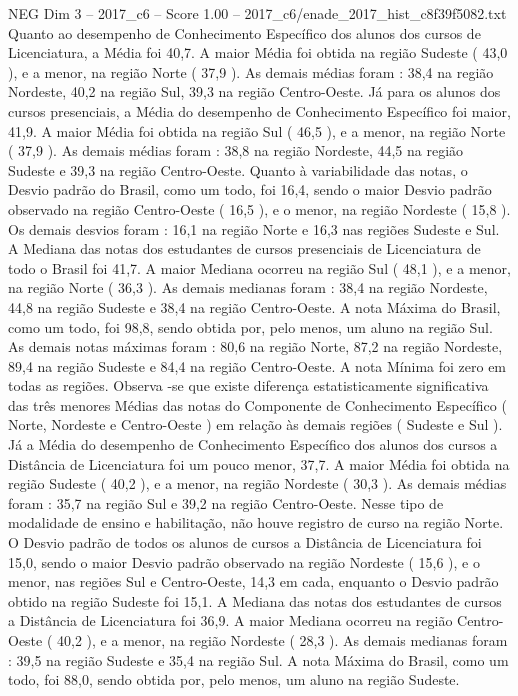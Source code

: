 \begin{textsample}{NEG Dim 3 – 2017\_c6 – Score 1.00 – 2017\_c6/enade\_2017\_hist\_c8f39f5082.txt}
Quanto ao desempenho de Conhecimento Específico dos alunos dos cursos de Licenciatura, a Média foi 40,7.
A maior Média foi obtida na região Sudeste ( 43,0 ), e a menor, na região Norte ( 37,9 ).
As demais médias foram : 38,4 na região Nordeste, 40,2 na região Sul, 39,3 na região Centro-Oeste.
Já para os alunos dos cursos presenciais, a Média do desempenho de Conhecimento Específico foi maior, 41,9.
A maior Média foi obtida na região Sul ( 46,5 ), e a menor, na região Norte ( 37,9 ).
As demais médias foram : 38,8 na região Nordeste, 44,5 na região Sudeste e 39,3 na região Centro-Oeste.
Quanto à variabilidade das notas, o Desvio padrão do Brasil, como um todo, foi 16,4, sendo o maior Desvio padrão observado na região Centro-Oeste ( 16,5 ), e o menor, na região Nordeste ( 15,8 ).
Os demais desvios foram : 16,1 na região Norte e 16,3 nas regiões Sudeste e Sul.
A Mediana das notas dos estudantes de cursos presenciais de Licenciatura de todo o Brasil foi 41,7.
A maior Mediana ocorreu na região Sul ( 48,1 ), e a menor, na região Norte ( 36,3 ).
As demais medianas foram : 38,4 na região Nordeste, 44,8 na região Sudeste e 38,4 na região Centro-Oeste.
A nota Máxima do Brasil, como um todo, foi 98,8, sendo obtida por, pelo menos, um aluno na região Sul.
As demais notas máximas foram : 80,6 na região Norte, 87,2 na região Nordeste, 89,4 na região Sudeste e 84,4 na região Centro-Oeste.
A nota Mínima foi zero em todas as regiões.
Observa -se que existe diferença estatisticamente significativa das três menores Médias das notas do Componente de Conhecimento Específico ( Norte, Nordeste e Centro-Oeste ) em relação às demais regiões ( Sudeste e Sul ).
Já a Média do desempenho de Conhecimento Específico dos alunos dos cursos a Distância de Licenciatura foi um pouco menor, 37,7.
A maior Média foi obtida na região Sudeste ( 40,2 ), e a menor, na região Nordeste ( 30,3 ).
As demais médias foram : 35,7 na região Sul e 39,2 na região Centro-Oeste.
Nesse tipo de modalidade de ensino e habilitação, não houve registro de curso na região Norte.
O Desvio padrão de todos os alunos de cursos a Distância de Licenciatura foi 15,0, sendo o maior Desvio padrão observado na região Nordeste ( 15,6 ), e o menor, nas regiões Sul e Centro-Oeste, 14,3 em cada, enquanto o Desvio padrão obtido na região Sudeste foi 15,1.
A Mediana das notas dos estudantes de cursos a Distância de Licenciatura foi 36,9.
A maior Mediana ocorreu na região Centro-Oeste ( 40,2 ), e a menor, na região Nordeste ( 28,3 ).
As demais medianas foram : 39,5 na região Sudeste e 35,4 na região Sul.
A nota Máxima do Brasil, como um todo, foi 88,0, sendo obtida por, pelo menos, um aluno na região Sudeste.

\end{textsample}
